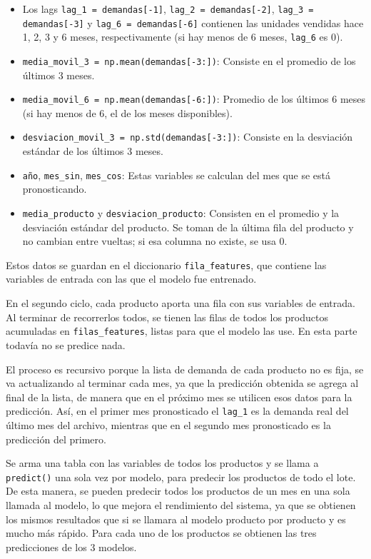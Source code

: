 \begin{itemize}
    \item Los lags \texttt{lag\_1 = demandas[-1]}, \texttt{lag\_2 = demandas[-2]}, \texttt{lag\_3 = demandas[-3]} y \texttt{lag\_6 = demandas[-6]} contienen las unidades vendidas hace 1, 2, 3 y 6 meses, respectivamente (si hay menos de 6 meses, \texttt{lag\_6} es 0).
    \item \texttt{media\_movil\_3 = np.mean(demandas[-3:])}: Consiste en el promedio de los últimos 3 meses.
    \item \texttt{media\_movil\_6 = np.mean(demandas[-6:])}: Promedio de los últimos 6 meses (si hay menos de 6, el de los meses disponibles).
    \item \texttt{desviacion\_movil\_3 = np.std(demandas[-3:])}: Consiste en la desviación estándar de los últimos 3 meses.
    \item \texttt{año}, \texttt{mes\_sin}, \texttt{mes\_cos}: Estas variables se calculan del mes que se está pronosticando.
    \item \texttt{media\_producto} y \texttt{desviacion\_producto}: Consisten en el promedio y la desviación estándar del producto. Se toman de la última fila del producto y no cambian entre vueltas; si esa columna no existe, se usa 0.
\end{itemize}


Estos datos se guardan en el diccionario \texttt{fila\_features}, que contiene las variables de entrada con las que el modelo fue entrenado. 

En el segundo ciclo, cada producto aporta una fila con sus variables de entrada. Al terminar de recorrerlos todos, se tienen las filas de todos los productos acumuladas en \texttt{filas\_features}, listas para que el modelo las use. En esta parte todavía no se predice nada.

El proceso es recursivo porque la lista de demanda de cada producto no es fija, se va actualizando al terminar cada mes, ya que la predicción obtenida se agrega al final de la lista, de manera que en el próximo mes se utilicen esos datos para la predicción. Así, en el primer mes pronosticado el \texttt{lag\_1} es la demanda real del último mes del archivo, mientras que en el segundo mes pronosticado es la predicción del primero.

Se arma una tabla con las variables de todos los productos y se llama a \texttt{predict()} una sola vez por modelo, para predecir los productos de todo el lote. De esta manera, se pueden predecir todos los productos de un mes en una sola llamada al modelo, lo que mejora el rendimiento del sistema, ya que se obtienen los mismos resultados que si se llamara al modelo producto por producto y es mucho más rápido. Para cada uno de los productos se obtienen las tres predicciones de los 3 modelos.


